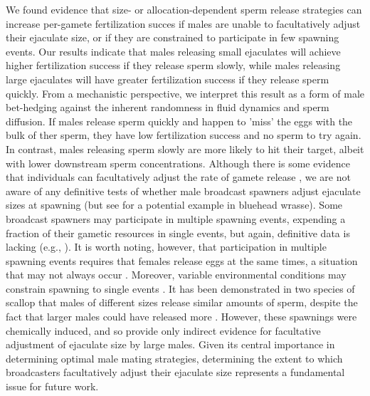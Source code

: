 \documentclass{article}
\begin{document}
We found evidence that size- or allocation-dependent sperm release strategies can increase per-gamete fertilization succes if males are unable to facultatively adjust their ejaculate size, or if they are constrained to participate in few spawning events. Our results indicate that males releasing small ejaculates will achieve higher fertilization success if they release sperm slowly, while males releasing large ejaculates will have greater fertilization success if they release sperm quickly. From a mechanistic perspective, we interpret this result as a form of male bet-hedging against the inherent randomness in fluid dynamics and sperm diffusion. If males release sperm quickly and happen to 'miss' the eggs with the bulk of ther sperm, they have low fertilization success and no sperm to try again. In contrast, males releasing sperm slowly are more likely to hit their target, albeit with lower downstream sperm concentrations. Although there is some evidence that individuals can facultatively adjust the rate of gamete release \citep{Marshall2004}, we are not aware of any definitive tests of whether male broadcast spawners adjust ejaculate sizes at spawning (but see \citealt{PetersenEtAl2001} for a potential example in bluehead wrasse). Some broadcast spawners may participate in multiple spawning events, expending a fraction of their gametic resources in single events, but again, definitive data is lacking (e.g., \citealt{Levitan1988,McEuan1988,LotterhosLevitan2011}). It is worth noting, however, that participation in multiple spawning events requires that females release eggs at the same times, a situation that may not always occur \citep{Olito2015,Olito2017}. Moreover, variable environmental conditions may constrain spawning to single events \citep{Olito2015,Olito2017}. It has been demonstrated in two species of scallop that males of different sizes release similar amounts of sperm, despite the fact that larger males could have released more \citep{Styan2003}. However, these spawnings were chemically induced, and so provide only indirect evidence for facultative adjustment of ejaculate size by large males. Given its central importance in determining optimal male mating strategies, determining the extent to which broadcasters facultatively adjust their ejaculate size represents a fundamental issue for future work.
\end{document}
